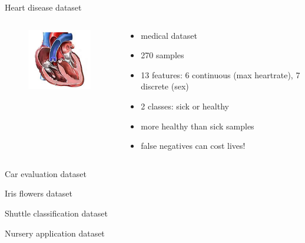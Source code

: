 \documentclass[english]{beamer}
\begin{document}
\begin{frame}{Heart disease dataset}
	\begin{columns}
		\begin{column}{0.35\textwidth}
			\begin{figure}
				\centering
				\includegraphics[scale=0.75]{figures/heart.jpg}
			\end{figure}
		\end{column}
		
		\begin{column}{0.65\textwidth}
			\begin{itemize}
				\item medical dataset
				\item 270 samples
				\item 13 features: 6 continuous (max heartrate), 7 discrete (sex)
				\item 2 classes: sick or healthy
				\item more healthy than sick samples
				\item false negatives can cost lives!
			\end{itemize}
		\end{column}
	\end{columns}
\end{frame}

\begin{frame}{Car evaluation dataset}
\end{frame}

\begin{frame}{Iris flowers dataset}
\end{frame}

\begin{frame}{Shuttle classification dataset}
\end{frame}

\begin{frame}{Nursery application dataset}
\end{frame}
\end{document}
